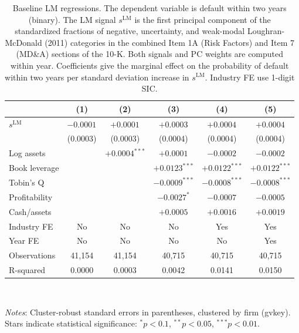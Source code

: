 \begin{table}[htbp]
\centering
\caption{Baseline LM regressions. The dependent variable is default within two years (binary). The LM signal $s^{\mathrm{LM}}$ is the first principal component of the standardized fractions of negative, uncertainty, and weak-modal Loughran-McDonald (2011) categories in the combined Item 1A (Risk Factors) and Item 7 (MD\&A) sections of the 10-K. Both signals and PC weights are computed within year. Coefficients give the marginal effect on the probability of default within two years per standard deviation increase in $s^{\mathrm{LM}}$. Industry FE use 1-digit SIC.}
\label{tab:t3_baseline_lm}
\small
\begin{tabular}{lccccc}
\toprule
 & (1) & (2) & (3) & (4) & (5) \\
\midrule
$s^{\mathrm{LM}}$ & $-0.0001^{}$ & $+0.0001^{}$ & $+0.0003^{}$ & $+0.0004^{}$ & $+0.0004^{}$ \\
 & (0.0003) & (0.0003) & (0.0004) & (0.0004) & (0.0004) \\
\midrule
Log assets &  & $+0.0004^{***}$ & $+0.0001^{}$ & $-0.0002^{}$ & $-0.0002^{}$ \\
Book leverage &  &  & $+0.0123^{***}$ & $+0.0122^{***}$ & $+0.0122^{***}$ \\
Tobin's Q &  &  & $-0.0009^{***}$ & $-0.0008^{***}$ & $-0.0008^{***}$ \\
Profitability &  &  & $-0.0027^{*}$ & $-0.0007^{}$ & $-0.0005^{}$ \\
Cash/assets &  &  & $+0.0005^{}$ & $+0.0016^{}$ & $+0.0019^{}$ \\
\midrule
Industry FE & No & No & No & Yes & Yes \\
Year FE & No & No & No & No & Yes \\
\midrule
Observations & 41,154 & 41,154 & 40,715 & 40,715 & 40,715 \\
R-squared & 0.0000 & 0.0003 & 0.0042 & 0.0141 & 0.0150 \\
\bottomrule
\end{tabular}
\\[-2ex]
\begin{flushleft}
\footnotesize
\textit{Notes}: Cluster-robust standard errors in parentheses, clustered by firm (gvkey). Stars indicate statistical significance: $^{*}p<0.1$, $^{**}p<0.05$, $^{***}p<0.01$.
\end{flushleft}
\end{table}